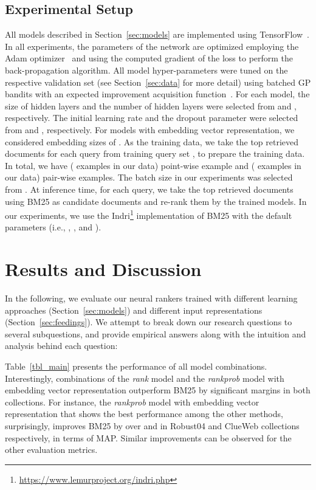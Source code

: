 \documentclass[sigconf]{acmart}
\newcommand{\modeltwo}{\textit{rank} model\xspace}
\newcommand{\modelthree}{\textit{rank\-prob} model\xspace}
\newcommand{\feedthree}{embedding vector representation\xspace}
\newcommand{\shrink}{\vspace{-1.5ex}}
\begin{document}
\subsection{Experimental Setup}
All models described in Section~\ref{sec:models} are implemented using TensorFlow~\citep{tang2016:tflearn,tensorflow2015-whitepaper}.
In all experiments, the parameters of the network are optimized employing the Adam optimizer~\citep{Kingma:2014} and using the computed gradient of the loss to perform the back-propagation algorithm.
All model hyper-parameters were tuned on the respective validation set (see Section~\ref{sec:data} for more detail) using batched GP bandits with an expected improvement acquisition function~\citep{Desautels:2014}. 
For each model, the size of hidden layers and the number of hidden layers were selected from  and , respectively. The initial learning rate and the dropout parameter were selected from  and , respectively. For models with \feedthree, we considered embedding sizes of . As the training data, we take the top  retrieved documents for each query from training query set , to prepare the training data. In total, we have  ( examples in our data) point-wise example and  ( examples in our data) pair-wise examples. The batch size in our experiments was selected from  .
At inference time, for each query, we take the top  retrieved documents using BM25 as candidate documents and re-rank them by the trained models. In our experiments, we use the Indri\footnote{\url{https://www.lemurproject.org/indri.php}} implementation of BM25 with the default parameters (i.e., , , and ).



\shrink
\section{Results and Discussion}
In the following, we evaluate our neural rankers trained with different learning approaches (Section~\ref{sec:models}) and different input representations (Section~\ref{sec:feedings}). We attempt to break down our research questions to several subquestions, and provide empirical answers along with the intuition and analysis behind each question:

Table~\ref{tbl_main} presents the performance of all model combinations.
Interestingly, combinations of the \modeltwo and the \modelthree with \feedthree outperform BM25 by significant margins in both collections. For instance, the \modelthree with \feedthree that shows the best performance among the other methods, surprisingly, improves BM25 by over  and  in Robust04 and ClueWeb collections respectively, in terms of MAP. Similar improvements can be observed for the other evaluation metrics.
\end{document}
